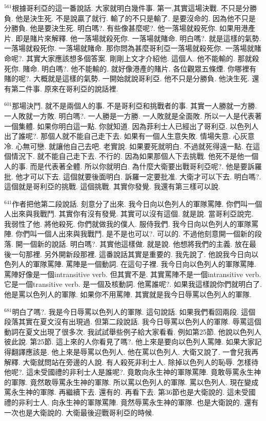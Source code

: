 \documentclass{book}
\begin{document}
$^{561}$根據哥利亞的這一番說話.
大家就明白幾件事.
第一,其實這場決戰.
不只是分勝負.
他是決生死.
不是說贏了就行.
輸了的不只是輸了.
是要沒命的.
因為他不只是分勝負.
他是要決生死.
明白嗎?.
有些像甚麼呢?.
他一落場就殺死你.
如果用港產片.
即是賭片來解釋.
他一落場就殺死你.
一落場就賭命.
明白嗎?.
就是這樣的氣勢.
一落場就殺死你.
一落場就賭命.
那你問為甚麼哥利亞一落場就殺死你.
一落場就賭命呢?.
其實大家應該想多個答案.
剛剛上文才介紹他.
這個人.
他不能輸的.
那就殺死你.
賭命.
明白嗎?.
他不能輸的.
就好像港產的賭片.
各位觀眾五條煙.
你哪裡有賭的呢?.
大概就是這樣的氣勢.
一開始就說哥利亞.
他不只是分勝負.
他決生死.
還有第二件事.
原來在哥利亞的說話裡.

$^{601}$那場決鬥.
就不是兩個人的事.
不是哥利亞和挑戰者的事.
其實一人勝就一方勝.
一人敗就一方敗.
明白嗎?.
一人勝是一方勝.
一人敗就是全面敗.
所以一人是代表著一個集體.
如果你明白這一點.
你就知道.
因為菲利士人已經出了哥利亞.
以色列人出了誰呢?.
那個人就不能自己走下去.
如果有一個人生意失敗.
情場失意.
心灰意冷.
心無可戀.
就讓他自己去吧.
老實說.
如果要死就明白.
不過就死得遠一點.
在這個情況下.
就不能自己走下去.
不行的.
因為如果那個人下去挑戰.
他死不是他一個人的事.
而是代表著全體.
所以你就明白.
為什麼大衛要出戰哥利亞呢?.
他是要訴羅批.
他才可以下去.
這個就要後面明白.
訴羅一定要批准.
大衛才可以下去.
明白嗎?.
這個就是哥利亞的挑戰.
這個挑戰.
其實你發覺.
我還有第三樣可以說.

$^{641}$作者把他第二段說話.
刻意分了出來.
我今日向以色列人的軍隊罵陣.
你們叫一個人出來與我戰鬥.
其實你有沒有發覺.
其實可以沒有這個.
就是說.
當哥利亞說完.
我弱性了他.
將他殺死.
你們就做我的僕人.
服侍我們.
我今日向以色列人的軍隊罵陣.
你們叫一個人出來與我戰鬥.
是不是也可以?.
可以的.
不過他刻意開一個新的段落.
開一個新的說話.
明白嗎?.
其實他這樣做.
就是說.
他想將我們的主義.
放在最後一句那裡.
另外開新段那裡.
這番說話其實是重要的.
我先說了.
他說我今日向以色列人的軍隊罵陣.
罵陣是一個動詞.
在這句子裡.
我今日向以色列人的軍隊罵陣.
罵陣好像是一個intransitive verb.
但其實不是.
其實罵陣不是一個intransitive verb.
它是一個transitive verb.
是一個及核動詞.
他罵誰呢?.
如果我這樣說你們就明白了.
他是罵以色列人的軍隊.
如果你不用罵陣.
其實就是我今日辱罵以色列人的軍隊.

$^{681}$明白了嗎?.
我是今日辱罵以色列人的軍隊.
這句說話.
如果我們看回兩段.
這個段落其實在夏文沒有出現過.
但第二段說話.
我今日辱罵以色列人的軍隊.
辱罵這個動詞在夏文出現了很多次.
我試試舉些例子給大家看看.
例如第25節.
他說以色列人彼此說.
第25節.
這上來的人你看見了嗎?.
他上來是要向以色列人罵陣.
如果大家記得翻譯應該是.
他上來是辱罵以色列人.
他在罵以色列人.
大衛又說了.
一會兒我再解釋.
大衛就問站在旁邊的人說.
有人殺死非利士人.
除掉以色列人的恥辱.
怎樣待他呢?.
這未受國禮的非利士人是誰呢?.
竟敢向永生神的軍隊罵陣.
竟敢辱罵永生神的軍隊.
竟然敢辱罵永生神的軍隊.
所以罵以色列人的軍隊.
罵以色列人.
現在變成罵永生神的軍隊.
再繼續下去.
還有的.
再看下去.
第36節也是大衛說的.
這未受國禮的非利士人.
向永生神的軍隊罵陣.
竟然辱罵永生神的軍隊.
也是大衛說的.
還有一次也是大衛說的.
大衛最後迎戰哥利亞的時候.
\end{document}
